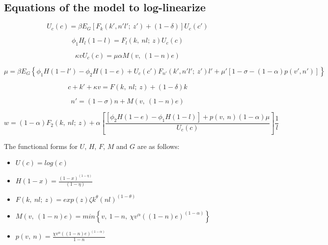 \documentclass[english]{article}
\begin{document}
\subsection{Equations of the model to log-linearize}

\begin{equation} \label{eq:P1}
U_{c}(c)=\beta E_{G}\left[F_{k}(k',n'l';\: z')+(1-\delta)\right]U_{c}(c')
\end{equation}


\begin{equation} \label{eq:P2}
\phi_{1}H_{l}(1-l)=F_{l}(k,\: nl;\: z)U_{c}(c)
\end{equation}
 

\begin{equation} \label{eq:P3}
\kappa vU_{c}(c)=\mu\alpha M(v,\:(1-n)e)
\end{equation}


\begin{equation} \label{eq:P4}
\mu=\beta E_{G}\left\{ \phi_{1}H(1-l')-\phi_{2}H(1-e)+U_{c}(c')F_{n'}(k',n'l';\: z')l'+\mu'\left[1-\sigma-(1-\alpha)p(v',n')\right]\right\} 
\end{equation}


\begin{equation} \label{eq:P5}
c+k'+\kappa v=F(k,\: nl;\: z)+(1-\delta)k
\end{equation}


\begin{equation} \label{eq:P6}
n'=(1-\sigma)n+M(v,\:(1-n)e)
\end{equation}



\begin{equation} \label{eq:P7}
w=(1-\alpha)F_{2}(k,\: nl;\: z)+\alpha\left[\frac{\left[\phi_{2}H(1-e)-\phi_{1}H(1-l)\right]+p(v,\: n)(1-\alpha)\mu}{U_{c}(c)}\right]\frac{1}{l}
\end{equation}


The functional forms for $U$, $H$, $F$, $M$ and $G$ are as follows:
\begin{itemize}
\item $U(c)=log(c)$
\item $H(1-x)=\frac{\left(1-x\right)^{(1-\eta)}}{(1-\eta)}$
\item $F(k,\: nl;\: z)=exp(z)\zeta k^{\theta}(nl)^{(1-\theta)}$
\item $M(v,\:(1-n)e)=min\left\{ v,\:1-n,\:\chi v^{\alpha}((1-n)e)^{(1-\alpha)}\right\} $
\item $p(v,\: n)=\frac{\chi v^{\alpha}((1-n)e)^{(1-\alpha)}}{1-n}$
\end{itemize}
\end{document}
